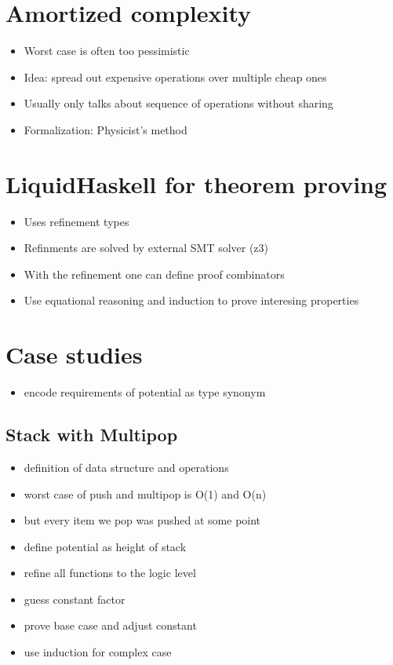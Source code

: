 \documentclass[sigplan,screen]{acmart}
\begin{document}
\section{Amortized complexity}

\begin{itemize}
\item{Worst case is often too pessimistic}
\item{Idea: spread out expensive operations over multiple cheap ones}
\item{Usually only talks about sequence of operations without sharing}
\item{Formalization: Physicist's method}
\end{itemize}

\section{LiquidHaskell for theorem proving}

\begin{itemize}
\item{Uses refinement types}
\item{Refinments are solved by external SMT solver (z3)}
\item{With the refinement one can define proof combinators}
\item{Use equational reasoning and induction to prove interesing properties}
\end{itemize}

\section{Case studies}

\begin{itemize}
\item{encode requirements of potential as type synonym}
\end{itemize}

\subsection{Stack with Multipop}

\begin{itemize}
\item{definition of data structure and operations}
\item{worst case of push and multipop is O(1) and O(n)}
\item{but every item we pop was pushed at some point}
\item{define potential as height of stack}
\item{refine all functions to the logic level \cite{reflection}}
\item{guess constant factor}
\item{prove base case and adjust constant}
\item{use induction for complex case}
\end{itemize}
\end{document}
